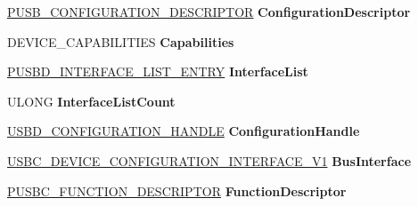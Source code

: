 \begin{DoxyCompactItemize}
\item 
\mbox{\label{struct_f_d_o___d_e_v_i_c_e___e_x_t_e_n_s_i_o_n_aa24f521d763c5e5a5c855a4049e8074a}} 
\hyperlink{struct___u_s_b___c_o_n_f_i_g_u_r_a_t_i_o_n___d_e_s_c_r_i_p_t_o_r}{P\+U\+S\+B\+\_\+\+C\+O\+N\+F\+I\+G\+U\+R\+A\+T\+I\+O\+N\+\_\+\+D\+E\+S\+C\+R\+I\+P\+T\+OR} {\bfseries Configuration\+Descriptor}
\item 
\mbox{\label{struct_f_d_o___d_e_v_i_c_e___e_x_t_e_n_s_i_o_n_a0333671260a319a1935dc68be3b548cb}} 
D\+E\+V\+I\+C\+E\+\_\+\+C\+A\+P\+A\+B\+I\+L\+I\+T\+I\+ES {\bfseries Capabilities}
\item 
\mbox{\label{struct_f_d_o___d_e_v_i_c_e___e_x_t_e_n_s_i_o_n_acab08d24ca2bbf4c6f0e157eb985e762}} 
\hyperlink{struct___u_s_b_d___i_n_t_e_r_f_a_c_e___l_i_s_t___e_n_t_r_y}{P\+U\+S\+B\+D\+\_\+\+I\+N\+T\+E\+R\+F\+A\+C\+E\+\_\+\+L\+I\+S\+T\+\_\+\+E\+N\+T\+RY} {\bfseries Interface\+List}
\item 
\mbox{\label{struct_f_d_o___d_e_v_i_c_e___e_x_t_e_n_s_i_o_n_a0c660350680fc42df68ddc03cbe75cb2}} 
U\+L\+O\+NG {\bfseries Interface\+List\+Count}
\item 
\mbox{\label{struct_f_d_o___d_e_v_i_c_e___e_x_t_e_n_s_i_o_n_a9ad21541cb5fc7c79ef58425307abe87}} 
\hyperlink{interfacevoid}{U\+S\+B\+D\+\_\+\+C\+O\+N\+F\+I\+G\+U\+R\+A\+T\+I\+O\+N\+\_\+\+H\+A\+N\+D\+LE} {\bfseries Configuration\+Handle}
\item 
\mbox{\label{struct_f_d_o___d_e_v_i_c_e___e_x_t_e_n_s_i_o_n_a7c41c14b2b77f6d2c836ce2fb27e3a67}} 
\hyperlink{struct___u_s_b_c___d_e_v_i_c_e___c_o_n_f_i_g_u_r_a_t_i_o_n___i_n_t_e_r_f_a_c_e___v1}{U\+S\+B\+C\+\_\+\+D\+E\+V\+I\+C\+E\+\_\+\+C\+O\+N\+F\+I\+G\+U\+R\+A\+T\+I\+O\+N\+\_\+\+I\+N\+T\+E\+R\+F\+A\+C\+E\+\_\+\+V1} {\bfseries Bus\+Interface}
\item 
\mbox{\label{struct_f_d_o___d_e_v_i_c_e___e_x_t_e_n_s_i_o_n_a1b61027e4b856bed5b002e7e28fe748f}} 
\hyperlink{struct___u_s_b_c___f_u_n_c_t_i_o_n___d_e_s_c_r_i_p_t_o_r}{P\+U\+S\+B\+C\+\_\+\+F\+U\+N\+C\+T\+I\+O\+N\+\_\+\+D\+E\+S\+C\+R\+I\+P\+T\+OR} {\bfseries Function\+Descriptor}

\end{DoxyCompactItemize}
